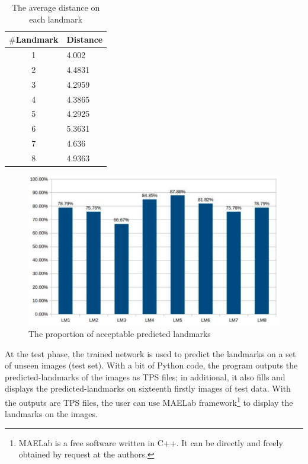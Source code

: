 \documentclass[conference]{IEEEtran}
\begin{document}
\begin{table}[htbp]
\caption{The average distance on each landmark}
\begin{center}
\begin{tabular}{|c|p{1.5cm}|}
\hline
\textbf{$\#$Landmark} & \textbf{Distance} \\ \hline
1 & 4.002  \\ \hline
2 & 4.4831 \\ \hline
3 & 4.2959 \\ \hline
4 & 4.3865 \\ \hline
5 & 4.2925 \\ \hline
6 & 5.3631 \\ \hline
7 & 4.636 \\ \hline
8 & 4.9363 \\ \hline
\end{tabular}
\label{tab2}
\end{center}
\end{table}

\begin{figure}[htbp]
	\centerline{\includegraphics[scale=0.2]{images/chart}}
	\caption{The proportion of acceptable predicted landmarks}
	\label{figchart}
\end{figure}

At the test phase, the trained network is used to predict the landmarks on a set of unseen images (test set). With a bit of Python code, the program outputs the predicted-landmarks of the images as TPS files; in additional, it also fills and displays the predicted-landmarks on sixteenth firstly images of test data. With the outputs are TPS files, the user can use MAELab\cite{le2017maelab} framework\footnote{MAELab is a free software written in C++. It can be directly
and freely obtained by request at the authors.} to display the landmarks on the images.
\end{document}
